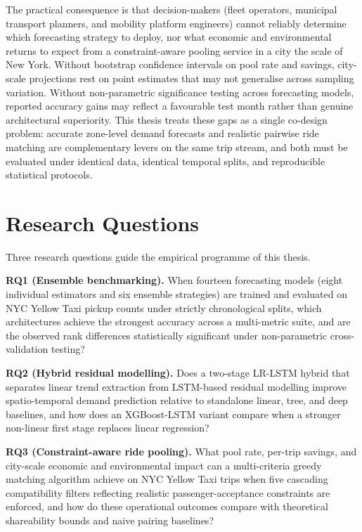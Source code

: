 The practical consequence is that decision-makers (fleet operators, municipal transport planners, and mobility platform engineers) cannot reliably determine which forecasting strategy to deploy, nor what economic and environmental returns to expect from a constraint-aware pooling service in a city the scale of New York. Without bootstrap confidence intervals on pool rate and savings, city-scale projections rest on point estimates that may not generalise across sampling variation. Without non-parametric significance testing across forecasting models, reported accuracy gains may reflect a favourable test month rather than genuine architectural superiority. This thesis treats these gaps as a single co-design problem: accurate zone-level demand forecasts and realistic pairwise ride matching are complementary levers on the same trip stream, and both must be evaluated under identical data, identical temporal splits, and reproducible statistical protocols.

\section{Research Questions}

Three research questions guide the empirical programme of this thesis.

\textbf{RQ1 (Ensemble benchmarking).} When fourteen forecasting models (eight individual estimators and six ensemble strategies) are trained and evaluated on NYC Yellow Taxi pickup counts under strictly chronological splits, which architectures achieve the strongest accuracy across a multi-metric suite, and are the observed rank differences statistically significant under non-parametric cross-validation testing?

\textbf{RQ2 (Hybrid residual modelling).} Does a two-stage LR-LSTM hybrid that separates linear trend extraction from LSTM-based residual modelling improve spatio-temporal demand prediction relative to standalone linear, tree, and deep baselines, and how does an XGBoost-LSTM variant compare when a stronger non-linear first stage replaces linear regression?

\textbf{RQ3 (Constraint-aware ride pooling).} What pool rate, per-trip savings, and city-scale economic and environmental impact can a multi-criteria greedy matching algorithm achieve on NYC Yellow Taxi trips when five cascading compatibility filters reflecting realistic passenger-acceptance constraints are enforced, and how do these operational outcomes compare with theoretical shareability bounds and naive pairing baselines?

